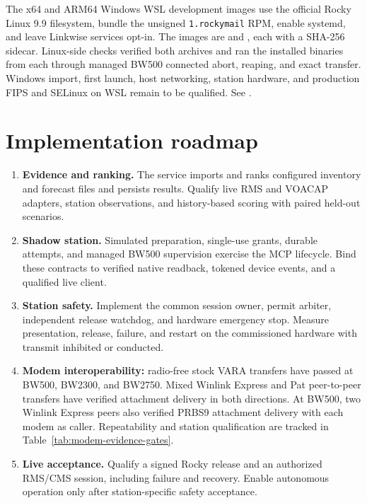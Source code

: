 \documentclass[11pt,a4paper]{article}
\begin{document}
The x64 and ARM64 Windows WSL development images use the official Rocky
Linux 9.9 filesystem, bundle the unsigned \texttt{1.rockymail} RPM, enable
systemd, and leave Linkwise services opt-in. The images are
 and , each
with a SHA-256 sidecar. Linux-side checks verified both archives and
ran the installed binaries from each through managed BW500 connected abort,
reaping, and exact transfer. Windows import, first launch, host networking,
station hardware, and production FIPS and SELinux on WSL remain to be
qualified. See .

\section{Implementation roadmap}

\begin{enumerate}
  \item \textbf{Evidence and ranking.} The service imports and ranks
        configured inventory and forecast files and persists results.
        Qualify live RMS and VOACAP adapters, station observations, and
        history-based scoring with paired held-out scenarios.
  \item \textbf{Shadow station.} Simulated preparation, single-use grants,
        durable attempts, and managed BW500 supervision exercise the MCP
        lifecycle. Bind these contracts to verified native readback,
        tokened device events, and a qualified live client.
  \item \textbf{Station safety.} Implement the common session owner, permit
        arbiter, independent release watchdog, and hardware emergency stop.
        Measure presentation, release, failure, and restart on the
        commissioned hardware with transmit inhibited or conducted.
  \item \textbf{Modem interoperability:} radio-free stock VARA transfers
        have passed at BW500, BW2300, and BW2750. Mixed Winlink Express
        and Pat peer-to-peer transfers have verified attachment delivery
        in both directions. At BW500, two Winlink Express peers also
        verified PRBS9 attachment delivery with each modem as caller.
        Repeatability and station qualification are
        tracked in Table~\ref{tab:modem-evidence-gates}.
  \item \textbf{Live acceptance.} Qualify a signed Rocky release and an
        authorized RMS/CMS session, including failure and recovery. Enable
        autonomous operation only after station-specific safety acceptance.
\end{enumerate}
\end{document}
